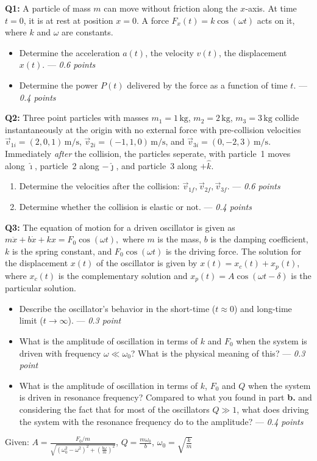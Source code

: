 \documentclass[a4paper,12pt]{article}
\begin{document}
\textbf{Q1:} A particle of mass $m$ can move without friction along the  $x$-axis. At time $t = 0$, it is at rest at position $x = 0$. A force $F_x(t) = k\cos(\omega t)$ acts on it, where $k$ and $\omega$ are constants. 
\begin{itemize}
    \item[(a)] Determine the acceleration $a(t)$, the velocity $v(t)$, the displacement $x(t)$. --- \textit{0.6 points}
    \item[(b)] Determine the power $P(t)$ delivered by the force as a function of time $t$. --- \textit{0.4 points}
\end{itemize}

\textbf{Q2:} Three point particles with masses $m_1 = 1\,\mathrm{kg}$, $m_2 = 2\,\mathrm{kg}$, $m_3 = 3\,\mathrm{kg}$ collide instantaneously at the origin with no external force with pre-collision velocities $\vec{v}_{1i} = (2,0,1)\,\mathrm{m/s}$, $\vec{v}_{2i} = (-1,1,0)\,\mathrm{m/s}$, and
$\vec{v}_{3i} = (0,-2,3)\,\mathrm{m/s}$. Immediately \emph{after} the collision, the particles seperate, with particle~1 moves along $\hat{\imath}$, particle~2 along 
\(-\hat{\jmath}\), and particle~3 along \(+\hat{k}\).  
\begin{enumerate}
\item[(a)] Determine the velocities after the collision: 
\(\vec{v}_{1f}, \vec{v}_{2f}, \vec{v}_{3f}\). --- \textit{0.6 points}
\item[(b)] Determine whether the collision is elastic or not. --- \textit{0.4 points}
\end{enumerate}

\textbf{Q3:} The equation of motion for a driven oscillator is given as $m \ddot{x} + b \dot{x} + k x = F_0 \cos(\omega t),$ where $m$ is the mass, $b$ is the damping coefficient, $k$ is the spring constant, and $F_0 \cos(\omega t)$ is the driving force. The solution for the displacement $x(t)$ of the oscillator is given by $x(t) = x_c(t) + x_p(t)$, where $x_c(t)$ is the complementary solution and $x_p(t) = A \cos(\omega t - \delta)$ is the particular solution. 

\begin{itemize}
    \item[\textbf{a.}] Describe the oscillator's behavior in the short-time ($t\approx 0$) and long-time limit ($t \to \infty$). --- \textit{0.3 point}
    \item[\textbf{b.}] What is the amplitude of oscillation in terms of $k$ and $F_0$ when the system is driven with frequency $\omega \ll \omega_0$? What is the physical meaning of this? --- \textit{0.3 point}
    \item[\textbf{c.}] What is the amplitude of oscillation in terms of $k$, $F_0$ and $Q$ when the system is driven in resonance frequency? Compared to what you found in part \textbf{b.} and considering the fact that for most of the oscillators $Q\gg 1$, what does driving the system with the resonance frequency do to the amplitude? --- \textit{0.4 points}
\end{itemize}
Given: $A = \frac{F_0/m}{\sqrt{\left(\omega_0^2 - \omega^2\right)^2 + \left(\frac{b \omega}{m}\right)^2}}$, $Q = \frac{m \omega_0}{b}$, $\omega_0 = \sqrt{\frac{k}{m}}$
\end{document}

